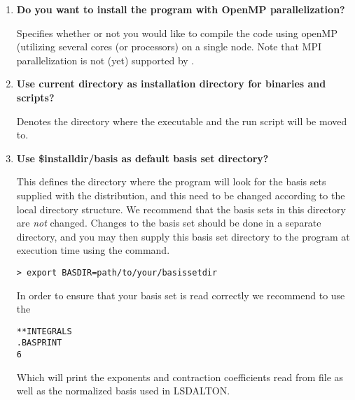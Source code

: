 \begin{enumerate}

\item {\bf Do you want to install the program with OpenMP parallelization?}

Specifies whether or not you would like to compile the code using openMP (utilizing
several cores (or processors) on a single node.
Note that MPI parallelization
is not (yet) supported by {\lsdalton}.

%
%
%

\item {\bf Use current directory as installation directory for binaries and scripts?}

Denotes the directory where the executable and the
run script will be moved to.

\item {\bf Use \$installdir/basis as default basis set directory?}

This defines the directory where the program will look for the
basis sets supplied with the distribution, and this need to be
changed according to the local directory structure. We recommend
that the basis sets in this directory are {\em not} changed.
Changes to the basis set should be done in a separate
directory, and you may then supply this basis set directory to the program
at execution time using the command.
\begin{verbatim}
> export BASDIR=path/to/your/basissetdir
\end{verbatim}
In order to ensure that your basis set is read correctly we recommend to use the
\begin{verbatim}
**INTEGRALS
.BASPRINT 
6
\end{verbatim}
Which will print the exponents and contraction coefficients read from file as 
well as the normalized basis used in LSDALTON.  


\end{enumerate}
